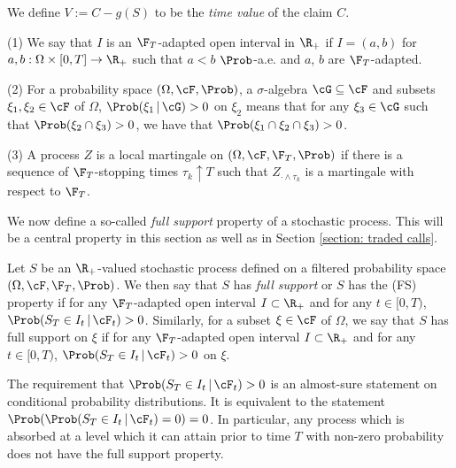 \documentclass[11pt]{article}
\begin{document}
\begin{definition}
We define $V := C - g(S)$ to be the \textit{time value} of the claim $C$.
\end{definition}

\begin{notation}
\item (1) We say that $I$ is an $\F_T$-adapted open interval in $\R_+$ if $I = (a,b)$ for $a, b: \Omega \times [0,T] \to \R_+$ such that $a < b$ $\Prob$-a.e. and $a$, $b$ are $\F_T$-adapted. 

\item (2) For a probability space $(\Omega, \cF, \Prob)$, a $\sigma$-algebra $\cG \subseteq \cF$ and subsets $\xi_1, \xi_2 \in \cF$ of $\Omega$, $\Prob(\xi_1 \, | \, \cG) > 0$ on $\xi_2$ means that for any $\xi _3 \in \cG$ such that $\Prob(\xi_2 \cap \xi_3) > 0$, we have that $\Prob( \xi_1 \cap \xi_2 \cap \xi_3) > 0$. 

\item (3) A process $Z$ is a local martingale on $(\Omega, \cF, \F_T, \Prob)$ if there is a sequence of $\F_T$-stopping times $\tau_k \uparrow T$ such that $Z_{\cdot \wedge \tau_k}$ is a martingale with respect to $\F_T$.
\end{notation}

We now define a so-called \textit{full support} property of a stochastic process. This will be a central property in this section as well as in Section \ref{section: traded calls}. 

\begin{definition}
Let $S$ be an $\R_+$-valued stochastic process defined on a filtered probability space $(\Omega, \cF, \F_T, \Prob)$. We then say that $S$ has \textit{full support} or $S$ has the (FS) property if for any $\F_T$-adapted open interval $I \subset \R_+$ and for any $t \in [0,T)$, $\Prob(S_T \in I_t \, | \, \cF_t) > 0$. Similarly, for a subset $\xi \in \cF$ of $\Omega$, we say that $S$ has full support on $\xi$ if for any $\F_T$-adapted open interval $I \subset \R_+$ and for any $t \in [0,T)$, $\Prob(S_T \in I_t \, | \, \cF_t) > 0$ on $\xi$.
\end{definition}

The requirement that $\Prob(S_T \in I_t \, | \, \cF_t) > 0$ is an almost-sure statement on conditional probability distributions. It is equivalent to the statement $\Prob( \Prob(S_T \in I_t \, | \, \cF_t) = 0) = 0$. In particular, any process which is absorbed at a level which it can attain prior to time $T$ with non-zero probability does not have the full support property.
\end{document}

